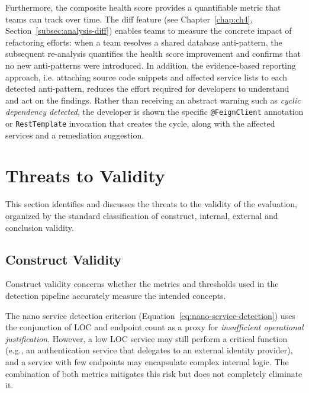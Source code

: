 \par Furthermore, the composite health score provides a quantifiable metric that teams can track over time. The diff feature (see Chapter~\ref{chap:ch4}, Section~\ref{subsec:analysis-diff}) enables teams to measure the concrete impact of refactoring efforts: when a team resolves a shared database anti-pattern, the subsequent re-analysis quantifies the health score improvement and confirms that no new anti-patterns were introduced. In addition, the evidence-based reporting approach, i.e. attaching source code snippets and affected service lists to each detected anti-pattern, reduces the effort required for developers to understand and act on the findings. Rather than receiving an abstract warning such as \textit{cyclic dependency detected}, the developer is shown the specific \texttt{@FeignClient} annotation or \texttt{RestTemplate} invocation that creates the cycle, along with the affected services and a remediation suggestion.

\section{Threats to Validity}
\label{sec:threats-validity}

\par This section identifies and discusses the threats to the validity of the evaluation, organized by the standard classification of construct, internal, external and conclusion validity.

\subsection{Construct Validity}
\label{subsec:construct-validity}

\par Construct validity concerns whether the metrics and thresholds used in the detection pipeline accurately measure the intended concepts.

\par The nano service detection criterion (Equation~\ref{eq:nano-service-detection}) uses the conjunction of LOC and endpoint count as a proxy for \textit{insufficient operational justification}. However, a low LOC service may still perform a critical function (e.g., an authentication service that delegates to an external identity provider), and a service with few endpoints may encapsulate complex internal logic. The combination of both metrics mitigates this risk but does not completely eliminate it.

